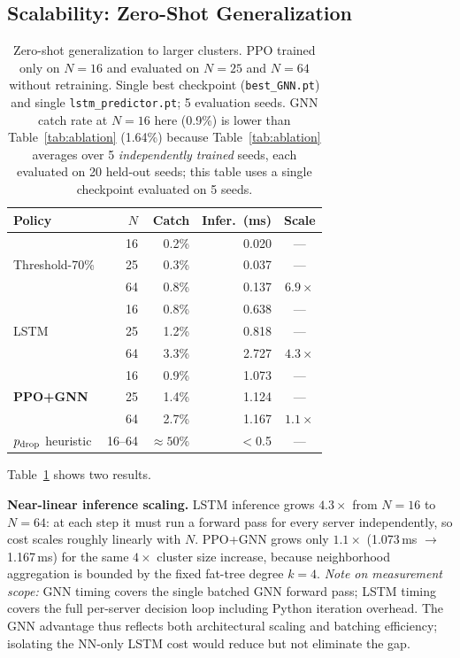 \documentclass[review,1p]{elsarticle}
\theoremstyle{definition}
\begin{document}
\subsection{Scalability: Zero-Shot Generalization}
\label{sec:scalability}
\label{sec:transfer}

\begin{table}[t]
\centering
\small
\caption{Zero-shot generalization to larger clusters. PPO trained only
on $N{=}16$ and evaluated on $N{=}25$ and $N{=}64$ without retraining.
Single best checkpoint (\texttt{best\_GNN.pt}) and single \texttt{lstm\_predictor.pt};
5 evaluation seeds.
GNN catch rate at $N{=}16$ here (0.9\%) is lower than Table~\ref{tab:ablation}
(1.64\%) because Table~\ref{tab:ablation} averages over 5 \emph{independently
trained} seeds, each evaluated on 20 held-out seeds; this table uses a single checkpoint
evaluated on 5 seeds.}
\label{tab:scale}
\begin{tabular}{lrrrc}
\toprule
Policy & $N$ & Catch & Infer.\ (ms) & Scale \\
\midrule
\multirow{3}{*}{Threshold-70\%}
 & 16 & 0.2\% & 0.020 & --- \\
 & 25 & 0.3\% & 0.037 & --- \\
 & 64 & 0.8\% & 0.137 & $6.9\times$ \\
\midrule
\multirow{3}{*}{LSTM}
 & 16 & 0.8\% & 0.638 & --- \\
 & 25 & 1.2\% & 0.818 & --- \\
 & 64 & 3.3\% & 2.727 & $4.3\times$ \\
\midrule
\multirow{3}{*}{\textbf{PPO+GNN}}
 & 16 & 0.9\% & 1.073 & --- \\
 & 25 & 1.4\% & 1.124 & --- \\
 & 64 & 2.7\% & 1.167 & $\mathbf{1.1\times}$ \\
\midrule
$p_{\rm drop}$ heuristic & 16--64 & ${\approx}50\%$ & $<$0.5 & --- \\
\bottomrule
\end{tabular}
\end{table}

Table~\ref{tab:scale} shows two results.

\textbf{Near-linear inference scaling.}
LSTM inference grows $4.3\times$ from $N{=}16$ to $N{=}64$: at each
step it must run a forward pass for every server independently,
so cost scales roughly linearly with $N$.
PPO+GNN grows only $1.1\times$ (1.073\,ms $\to$ 1.167\,ms)
for the same $4\times$ cluster size increase, because neighborhood
aggregation is bounded by the fixed fat-tree degree $k{=}4$.
\emph{Note on measurement scope:} GNN timing covers the single batched
GNN forward pass; LSTM timing covers the full per-server decision loop
including Python iteration overhead.  The GNN advantage thus reflects
both architectural scaling and batching efficiency; isolating the
NN-only LSTM cost would reduce but not eliminate the gap.
\end{document}
